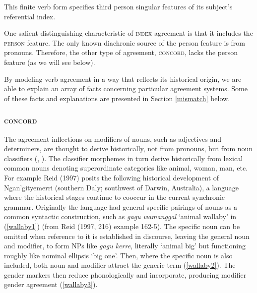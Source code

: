 \documentclass[output=paper]{langsci/langscibook}
\begin{document}
\noindent
This finite verb form specifies third person singular features of its subject's referential index.  

One salient distinguishing characteristic of \textsc{index} agreement is that it includes the \textsc{person} feature.  The only known diachronic source of the person feature is from pronouns.  Therefore, the other type of agreement, \textsc{concord}, lacks the person feature (as we will see below).  

By modeling verb agreement in a way that reflects its historical origin, we are able to explain an array of facts concerning particular agreement systems.   Some of these facts and explanations are presented in Section \ref{mismatch} below.  
 



\subsubsection{\textsc{concord}}
\label{concord-sec}
The agreement inflections on modifiers of nouns, such as adjectives and determiners, are thought to derive historically, not from pronouns, but from noun classifiers 
(\cite{greenberg:1978,reid:1997,Seifart:2009,Grinevald+Seifart:2004},   \cite[p. \ 268--9]{corbett:2006}).
The classifier morphemes in turn derive historically from lexical common nouns denoting  superordinate categories like animal, woman, man, etc.  For example Reid (1997) posits the following historical development of Ngan’gityemerri (southern Daly; southwest of Darwin, Australia), a language where the historical stages continue to cooccur in the current synchronic grammar.   Originally the language had general-specific pairings of nouns as a common syntactic construction, such as  \textit{gagu wamanggal}  ‘animal wallaby’ in (\ref{wallaby1}) (from Reid (1997, 216) example 162-5).  The specific noun can be omitted when reference to it is established in discourse, leaving the general noun and modifier, to form NPs like \textit{gagu kerre}, literally ‘animal big’ but functioning roughly like nominal ellipsis ‘big one’.  Then, where the specific noun is also included, both noun and modifier attract the generic term (\ref{wallaby2}).  The gender markers then reduce phonologically and incorporate, producing modifier gender agreement (\ref{wallaby3}). 
\end{document}
